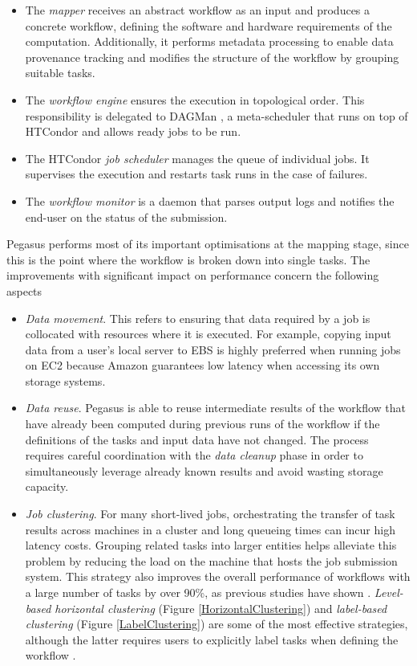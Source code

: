 \begin{itemize}
	\item The \textit{mapper} receives an abstract workflow as an input and produces a concrete workflow, defining the software and hardware requirements of the computation. Additionally, it performs metadata processing to enable data provenance tracking and modifies the structure of the workflow by grouping suitable tasks.
	\item The \textit{workflow engine} ensures the execution in topological order. This responsibility is delegated to DAGMan \cite{DAGMan}, a meta-scheduler that runs on top of HTCondor \cite{HTCondor} and allows ready jobs to be run.
	\item The HTCondor \textit{job scheduler} manages the queue of individual jobs. It supervises the execution and restarts task runs in the case of failures.
	\item The \textit{workflow monitor} is a daemon that parses output logs and notifies the end-user on the status of the submission.
\end{itemize}

Pegasus performs most of its important optimisations at the mapping stage, since this is the point where the workflow is broken down into single tasks. The improvements with significant impact on performance concern the following aspects \cite{Deelman2016}

\begin{itemize}
	\item \textit{Data movement}. This refers to ensuring that data required by a job is collocated with resources where it is executed. For example, copying input data from a user's local server to EBS is highly preferred when running jobs on EC2 because Amazon guarantees low latency when accessing its own storage systems.
	\item \textit{Data reuse}. Pegasus is able to reuse intermediate results of the workflow that have already been computed during previous runs of the workflow if the definitions of the tasks and input data have not changed. The process requires careful coordination with the \textit{data cleanup} phase in order to simultaneously leverage already known results and avoid wasting storage capacity.
	\item \textit{Job clustering}. For many short-lived jobs, orchestrating the transfer of task results across machines in a cluster and long queueing times can incur high latency costs. Grouping related tasks into larger entities helps alleviate this problem by reducing the load on the machine that hosts the job submission system. This strategy also improves the overall performance of workflows with a large number of tasks by over 90\%, as previous studies have shown \cite{Deelman2010, Singh2008}. \textit{Level-based horizontal clustering} (Figure \ref{HorizontalClustering}) and \textit{label-based clustering} (Figure \ref{LabelClustering}) are some of the most effective strategies, although the latter requires users to explicitly label tasks when defining the workflow \cite{Deelman2013}.
\end{itemize}
	
